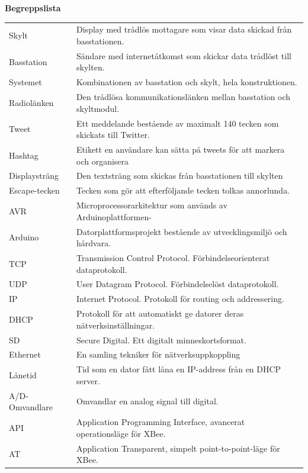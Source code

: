 \documentclass[a4paper,11pt]{article}
\begin{document}
\thispagestyle{empty}
\begin{center}
{\noindent \bf Begreppslista}\\
\end{center}

\begin{table}[h]
\centering
	\begin{tabular}{|l|l|}
Skylt & Display med trådlös mottagare som visar data skickad från basstationen.\\
Basstation & Sändare med internetåtkomst som skickar data trådlöst till skylten.\\
Systemet & Kombinationen av basstation och skylt, hela konstruktionen.\\
Radiolänken & Den trådlösa kommunikationslänken mellan basstation och skyltmodul.\\
Tweet & Ett meddelande bestående av maximalt 140 tecken som skickats till Twitter.\\
Hashtag & Etikett en användare kan sätta på tweets för att markera och organisera\\
Displaysträng & Den textsträng som skickas från basstationen till skylten \\
Escape-tecken & Tecken som gör att efterföljande tecken tolkas annorlunda.\\
AVR & Microprocessorarkitektur som används av Arduinoplattformen-\\
Arduino & Datorplattformsprojekt bestående av utvecklingsmiljö och hårdvara.\\
TCP & Transmission Control Protocol. Förbindelseorienterat dataprotokoll.\\
UDP & User Datagram Protocol. Förbindelselöst dataprotokoll.\\
IP & Internet Protocol. Protokoll för routing och addressering.\\
DHCP & Protokoll för att automatiskt ge datorer deras nätverksinställningar.\\
SD & Secure Digital. Ett digitalt minneskortsformat.\\
Ethernet & En samling tekniker för nätverksuppkoppling\\
Lånetid & Tid som en dator fått låna en IP-address från en DHCP server.\\
A/D-Omvandlare & Omvandlar en analog signal till digital.\\
API & Application Programming Interface, avancerat operationsläge för XBee.\\
AT & Application Transparent, simpelt point-to-point-läge för XBee.\\

\end{tabular}
\end{table}
\end{document}
